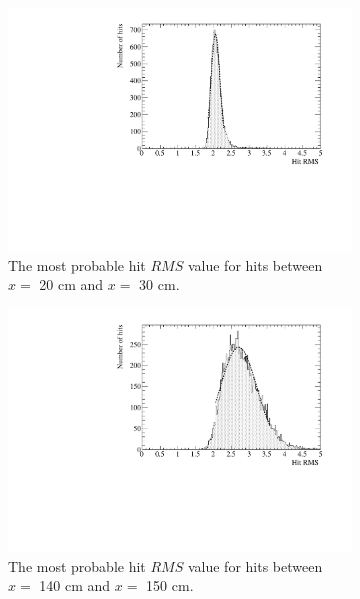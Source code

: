 \begin{figure}[h!]
  \centering
  \begin{subfigure}{0.48\textwidth}
    \centering
    \includegraphics[width=\textwidth]{DataCan_0}
    \caption{The most probable hit $RMS$ value for hits between $x =$ 20 cm and $x =$ 30 cm.}
  \end{subfigure}%
  \hspace{0.03\textwidth}%
  \begin{subfigure}{0.48\textwidth}
    \centering
    \includegraphics[width=\textwidth]{DataCan_1}
    \caption{The most probable hit $RMS$ value for hits between $x =$ 140 cm and $x =$ 150 cm.}
  \end{subfigure}
  \begin{subfigure}{0.48\textwidth}
    \centering

\end{subfigure}
\end{figure}
